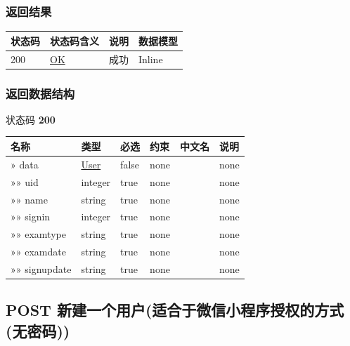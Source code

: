 \documentclass[
]{article}
\begin{document}
\hypertarget{ux8fd4ux56deux7ed3ux679c-24}{%
\subsubsection{返回结果}\label{ux8fd4ux56deux7ed3ux679c-24}}

\begin{longtable}[]{@{}llll@{}}
\toprule
状态码 & 状态码含义 & 说明 & 数据模型 \\
\midrule
\endhead
200 & \href{https://tools.ietf.org/html/rfc7231\#section-6.3.1}{OK} &
成功 & Inline \\
\bottomrule
\end{longtable}

\hypertarget{ux8fd4ux56deux6570ux636eux7ed3ux6784-19}{%
\subsubsection{返回数据结构}\label{ux8fd4ux56deux6570ux636eux7ed3ux6784-19}}

状态码 \textbf{200}

\begin{longtable}[]{@{}llllll@{}}
\toprule
名称 & 类型 & 必选 & 约束 & 中文名 & 说明 \\
\midrule
\endhead
» data & \protect\hyperlink{schemauser}{User} & false & none & & none \\
»» uid & integer & true & none & & none \\
»» name & string & true & none & & none \\
»» signin & integer & true & none & & none \\
»» examtype & string & true & none & & none \\
»» examdate & string & true & none & & none \\
»» signupdate & string & true & none & & none \\
\bottomrule
\end{longtable}

\hypertarget{post-ux65b0ux5efaux4e00ux4e2aux7528ux6237ux9002ux5408ux4e8eux5faeux4fe1ux5c0fux7a0bux5e8fux6388ux6743ux7684ux65b9ux5f0fux65e0ux5bc6ux7801}{%
\subsection{POST
新建一个用户(适合于微信小程序授权的方式(无密码))}\label{post-ux65b0ux5efaux4e00ux4e2aux7528ux6237ux9002ux5408ux4e8eux5faeux4fe1ux5c0fux7a0bux5e8fux6388ux6743ux7684ux65b9ux5f0fux65e0ux5bc6ux7801}}
\end{document}
